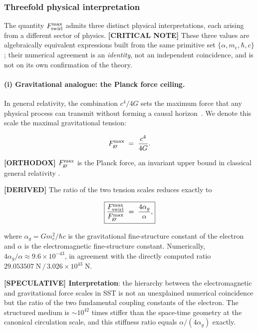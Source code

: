 \documentclass[11pt]{article}
\theoremstyle{definition}
\theoremstyle{plain}
\theoremstyle{remark}
\begin{document}
        \subsubsection{Threefold physical interpretation}

        The quantity $F_{\rm swirl}^{\max}$ admits three distinct physical interpretations, each arising from a different sector of physics. \textbf{[CRITICAL NOTE]} These three values are algebraically equivalent expressions built from the same primitive set $\{\alpha,m_e,\hbar,c\}$; their numerical agreement is an \emph{identity}, not an independent coincidence, and is not on its own confirmation of the theory.

        \paragraph{(i) Gravitational analogue: the Planck force ceiling.}

        In general relativity, the combination $c^4/4G$ sets the maximum force that any physical process can transmit without forming a causal horizon~\cite{Gibbons2002}. We denote this scale the maximal gravitational tension:

        \begin{align}
            F_{\rm gr}^{\max} \;=\; \frac{c^4}{4G}.
            \label{eq:Fgr}
        \end{align}

        \textbf{[ORTHODOX]} $F_{\rm gr}^{\max}$ is the Planck force, an invariant upper bound in classical general relativity \cite{Gibbons2002}.

        \textbf{[DERIVED]} The ratio of the two tension scales reduces exactly to

        \begin{align}
            \boxed{
            \frac{F_{\rm swirl}^{\max}}{F_{\rm gr}^{\max}}
            \;=\; \frac{4\alpha_g}{\alpha},
            }
            \label{eq:Fmax_ratio}
        \end{align}

        where $\alpha_g = Gm_e^2/\hbar c$ is the gravitational fine-structure constant of the electron and $\alpha$ is the electromagnetic fine-structure constant. Numerically, $4\alpha_g/\alpha \approx 9.6\times10^{-43}$, in agreement with the directly computed ratio $29.053507\;\text{N}\,/\,3.026\times10^{43}\;\text{N}$.

        \textbf{[SPECULATIVE] Interpretation}: the hierarchy between the electromagnetic and gravitational force scales in SST is not an unexplained numerical coincidence but the ratio of the two fundamental coupling constants of the electron. The structured medium is $\sim\!10^{42}$ times stiffer than the space-time geometry at the canonical circulation scale, and this stiffness ratio equals $\alpha/(4\alpha_g)$ exactly.
\end{document}
